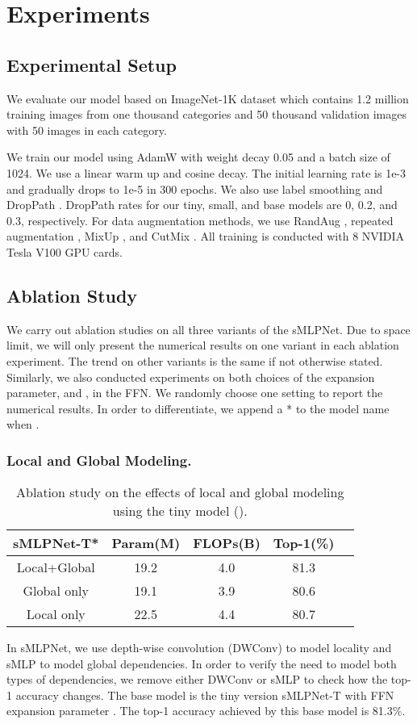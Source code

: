\documentclass[letterpaper]{article} \usepackage{aaai22}  \usepackage{times}  \usepackage{helvet}  \usepackage{courier}  \usepackage[hyphens]{url}  \usepackage{graphicx} \usepackage{color}
\begin{document}
\section{Experiments}
\subsection{Experimental Setup}
We evaluate our model based on ImageNet-1K dataset \cite{krizhevsky2012imagenet} which contains 1.2
million training images from one thousand categories and
50 thousand validation images with 50 images in each category. 

We train our model using AdamW \cite{loshchilov2018decoupled} with weight decay 0.05 and a batch size of 1024. We use a linear warm up and cosine decay. The initial learning rate is 1e-3 and gradually drops to 1e-5 in 300 epochs. We also use label smoothing \cite{szegedy2016rethinking} and DropPath \cite{larsson2016fractalnet}. DropPath rates for our tiny, small, and base models are 0, 0.2, and 0.3, respectively. For data augmentation methods, we use RandAug \cite{cubuk2020randaugment}, repeated augmentation \cite{hoffer2020augment}, MixUp \cite{zhang2018mixup}, and CutMix \cite{zhong2020random}. All training is conducted with 8 NVIDIA Tesla V100 GPU cards.

\subsection{Ablation Study}
We carry out ablation studies on all three variants of the sMLPNet. Due to space limit, we will only present the numerical results on one variant in each ablation experiment. The trend on other variants is the same if not otherwise stated. Similarly, we also conducted experiments on both choices of the expansion parameter,  and , in the FFN. We randomly choose one setting to report the numerical results. In order to differentiate, we append a * to the model name when .


\subsubsection{Local and Global Modeling.}
\begin{table}[t]
\centering
\begin{tabular}{c|c c c c}
    \hline
    sMLPNet-T* & Param(M) & FLOPs(B) & Top-1(\%) \\
    \hline
    Local+Global  &19.2 &4.0 &81.3  \\
    Global only   &19.1 &3.9 &80.6  \\
    Local only    &22.5 &4.4 &80.7  \\
\hline
\end{tabular}
\caption{Ablation study on the effects of local and global modeling using the tiny model ().}
\label{tab:local and global}
\end{table}
In sMLPNet, we use depth-wise convolution (DWConv) to model locality and sMLP to model global dependencies. In order to verify the need to model both types of dependencies, we remove either DWConv or sMLP to check how the top-1 accuracy changes. The base model is the tiny version sMLPNet-T with FFN expansion parameter . The top-1 accuracy achieved by this base model is 81.3\%. 
\end{document}
